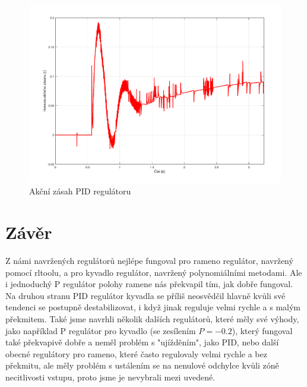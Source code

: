 \documentclass[11pt,a4paper]{article}
\begin{document}
\begin{figure}[H]
	\centering
    \includegraphics[scale=0.55]{odezva_kyvadlo_PID_akcnizasah}
    \caption{Akční zásah PID regulátoru}
\end{figure}

\section{Závěr}
Z námi navržených regulátorů nejlépe fungoval pro rameno regulátor, navržený pomocí rltoolu, a pro kyvadlo regulátor, navržený polynomiálními metodami. Ale i jednoduchý P regulátor polohy ramene nás překvapil tím, jak dobře fungoval. Na druhou stranu PID regulátor kyvadla se příliš neosvědčil hlavně kvůli své tendenci se postupně destabilizovat, i když jinak reguluje velmi rychle a s malým překmitem. Také jsme navrhli několik dalších regulátorů, které měly své výhody, jako například P regulátor pro kyvadlo (se zesílením $P=-0.2$), který fungoval také překvapivě dobře a neměl problém s "ujížděním", jako PID, nebo další obecné regulátory pro rameno, které často regulovaly velmi rychle a bez překmitu, ale měly problém s ustálením se na nenulové odchylce kvůli zóně necitlivosti vstupu, proto jsme je nevybrali mezi uvedené.
\newline
\end{document}
